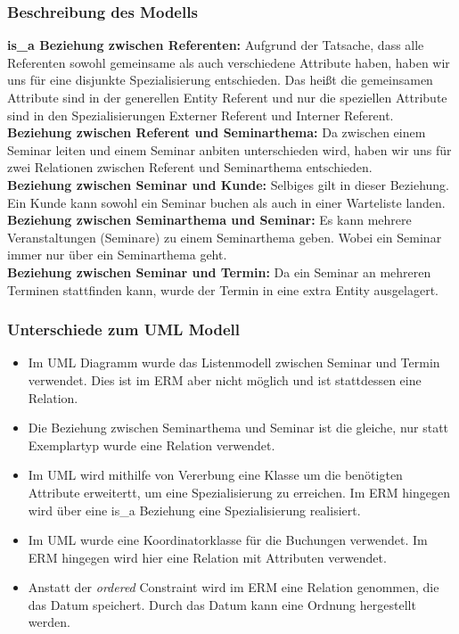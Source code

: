 \documentclass[10pt,a4paper]{report}
\begin{document}
\subsubsection{Beschreibung des Modells}

\textbf{is\_a Beziehung zwischen Referenten:} Aufgrund der Tatsache, dass alle Referenten sowohl gemeinsame als auch verschiedene Attribute haben, 
haben wir uns für eine disjunkte Spezialisierung entschieden. Das heißt die gemeinsamen Attribute sind in der 
generellen Entity Referent und nur die speziellen Attribute sind in den Spezialisierungen Externer Referent und
Interner Referent.
\\
\textbf{Beziehung zwischen Referent und Seminarthema:} Da zwischen einem Seminar leiten und einem Seminar anbiten 
unterschieden wird, haben wir uns für zwei Relationen zwischen Referent und Seminarthema entschieden.
\\
\textbf{Beziehung zwischen Seminar und Kunde:} Selbiges gilt in dieser Beziehung. Ein Kunde kann sowohl ein Seminar buchen 
als auch in einer Warteliste landen.
\\
\textbf{Beziehung zwischen Seminarthema und Seminar:} Es kann mehrere Veranstaltungen (Seminare) zu einem Seminarthema geben. Wobei ein Seminar immer nur über ein Seminarthema geht.
\\
\textbf{Beziehung zwischen Seminar und Termin:} Da ein Seminar an mehreren Terminen stattfinden kann, wurde der Termin in eine extra Entity ausgelagert.


\subsubsection{Unterschiede zum UML Modell}

\begin{itemize}

\item Im UML Diagramm wurde das Listenmodell zwischen Seminar und Termin verwendet. Dies ist im ERM aber nicht möglich und ist stattdessen eine Relation.
\item Die Beziehung zwischen Seminarthema und Seminar ist die gleiche, nur statt Exemplartyp wurde eine Relation verwendet.
\item Im UML wird mithilfe von Vererbung eine Klasse um die benötigten Attribute erweitertt, um eine Spezialisierung zu erreichen.
 Im ERM hingegen wird über eine is\_a Beziehung eine Spezialisierung realisiert.
\item Im UML wurde eine Koordinatorklasse für die Buchungen verwendet. Im ERM hingegen wird hier eine Relation mit Attributen verwendet.
\item Anstatt der \textit{ordered} Constraint wird im ERM eine Relation genommen, die das Datum speichert. Durch das Datum kann eine Ordnung hergestellt werden.

\end{itemize}
\end{document}
